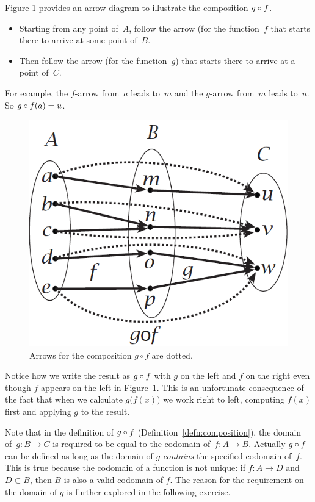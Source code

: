 \begin{example}{}
Figure \ref{arrowcomposefig} provides an arrow diagram to illustrate the composition $g \circ f$.
\begin{itemize}
\item Starting from any point of~$A$, follow the arrow (for the function~$f$ that starts there to arrive at some point of~$B$.
\item Then follow the arrow (for the function~$g$) that starts there to arrive at a point of~$C$.
\end{itemize}
For example, the $f$-arrow from~$a$ leads to~$m$ and the $g$-arrow from~$m$ leads to~$u$. So $g \circ f(a) = u$.
\begin{figure}[h]
\begin{center}
\includegraphics[scale=0.55]{images/arrowcompose.png}
\caption{Arrows for the composition $g \circ f$ are dotted.}
\label{arrowcomposefig}
\end{center}
\end{figure}
Notice how we write the result as $g \circ f$ with $g$ on the left and $f$ on the right even though $f$ appears on the left in Figure~\ref{arrowcomposefig}. This is an unfortunate consequence of the fact that when we calculate $g \bigl(f(x) \bigr)$ we work right to left, computing $f(x)$ first and applying $g$ to the result.
\end{example}

Note that in the definition of $g \circ f$ (Definition~\ref{defn:composition}), the domain of~$g:B\rightarrow C$ is required to be equal to the codomain of~$f:A \rightarrow B$. Actually $g \circ f$ can be defined as long as the domain of $g$ \emph{contains} the specified codomain of~$f$. This is true because the codomain of a function is not unique: if $f: A \rightarrow D$ and $D \subset B$, then $B$ is also a valid codomain of $f$. The reason for the requirement on the domain of $g$ is further explored in the following exercise.

